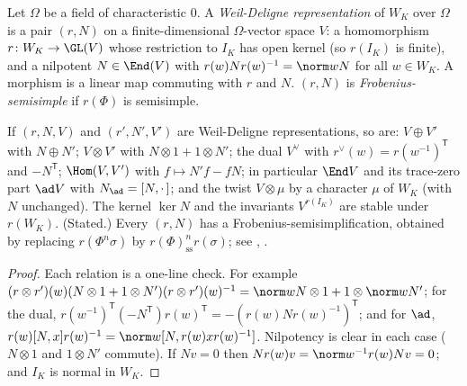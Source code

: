 \begin{definition}\label{def:local:wd}
Let $\Omega$ be a field of characteristic $0$. A \emph{Weil-Deligne representation} of $W_K$ over $\Omega$ is a pair $(r,N)$ on a finite-dimensional
$\Omega$-vector space $V$: a homomorphism $r\colon W_K\to\GL(V)$ whose restriction to $I_K$ has open kernel (so $r(I_K)$ is finite), and a nilpotent $N\in\End(V)$
with $r(w)Nr(w)^{-1}=\norm wN$ for all $w\in W_K$. A morphism is a linear map commuting with $r$ and $N$. $(r,N)$ is \emph{Frobenius-semisimple} if $r(\Phi)$ is
semisimple.
\end{definition}

\begin{proposition}\label{prop:local:wd-constructions}
If $(r,N,V)$ and $(r',N',V')$ are Weil-Deligne representations, so are: $V\oplus V'$ with $N\oplus N'$; $V\otimes V'$ with $N\otimes1+1\otimes N'$; the dual $V^\vee$ with
$r^\vee(w)=r(w^{-1})^{\mathsf T}$ and $-N^{\mathsf T}$; $\Hom(V,V')$ with $f\mapsto N'f-fN$; in particular $\End V$ and its trace-zero part $\ad V$ with $N_{\ad}=[N,\cdot\,]$; and the
twist $V\otimes\mu$ by a character $\mu$ of $W_K$ (with $N$ unchanged). The kernel $\ker N$ and the invariants $V^{r(I_K)}$ are stable under $r(W_K)$.
(Stated.) Every $(r,N)$ has a Frobenius-semisimplification, obtained by replacing $r(\Phi^n\sigma)$ by $r(\Phi)_{\mathrm{ss}}^nr(\sigma)$; see \cite[Section 8]{Deligne73},
\cite[Section 4.1]{Tate79}.
\end{proposition}

\begin{proof}
Each relation is a one-line check. For example $(r\otimes r')(w)(N\otimes1+1\otimes N')(r\otimes r')(w)^{-1}=\norm wN\otimes1+1\otimes\norm wN'$; for the dual,
$r(w^{-1})^{\mathsf T}(-N^{\mathsf T})r(w)^{\mathsf T}=-(r(w)Nr(w)^{-1})^{\mathsf T}$; and for $\ad$, $r(w)[N,x]r(w)^{-1}=\norm w[N,r(w)xr(w)^{-1}]$. Nilpotency is clear in each case
($N\otimes1$ and $1\otimes N'$ commute). If $Nv=0$ then $Nr(w)v=\norm w^{-1}r(w)Nv=0$; and $I_K$ is normal in $W_K$.
\end{proof}


